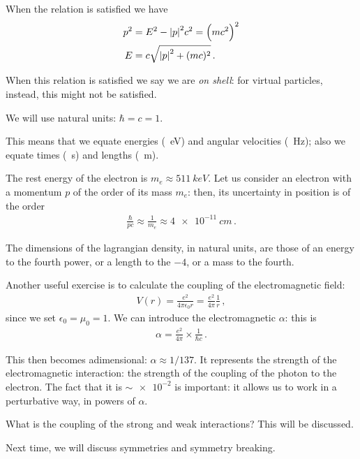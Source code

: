 \documentclass[main.tex]{subfiles}
\begin{document}
When the relation is satisfied we have 
%
\begin{align}
p^2 &= E^2 - \abs{p}^2 c^2= \qty(mc^2)^2  \\
E &= c \sqrt{\abs{p}^2 + (mc)^2}
\,.
\end{align}


When this relation is satisfied we say we are \emph{on shell}: for virtual particles, instead, this might not be satisfied.

We will use natural units: \(\hbar = c = 1\). 

This means that we equate energies (\SI{}{eV}) and angular velocities (\SI{}{Hz}); also we equate times (\SI{}{s}) and lengths (\SI{}{m}). 

The rest energy of the electron is \(m_e \approx \SI{511}{keV}\). 
Let us consider an electron with a momentum \(p\) of the order of its mass \(m_e\): then, its uncertainty in position is of the order 
%
\begin{align}
\frac{\hbar}{p c} \approx \frac{1}{m_e} \approx \SI{4e-11}{cm}
\,.
\end{align}

The dimensions of the lagrangian density, in natural units, are those of an energy to the fourth power, or a length to the \(-4\), or a mass to the fourth. 

Another useful exercise is to calculate the coupling of the electromagnetic field: 
%
\begin{align}
V(r) = \frac{e^2}{4 \pi \epsilon_{0} r} = \frac{e^2}{4 \pi } \frac{1}{r} 
\,,
\end{align}
%
since we set \(\epsilon_{0} = \mu_0 = 1\). 
We can introduce the electromagnetic \(\alpha \): this is 
%
\begin{align}
\alpha = \frac{e^2}{4 \pi } \times \frac{1}{\hbar c} 
\,.
\end{align}

This then becomes adimensional: \(\alpha \approx 1 / 137\). 
It represents the strength of the electromagnetic interaction: the strength of the coupling of the photon to the electron.  
The fact that it is \(\sim \num{e-2}\) is important: it allows us to work in a perturbative way, in powers of \(\alpha \). 

What is the coupling of the strong and weak interactions? This will be discussed.

Next time, we will discuss symmetries and symmetry breaking. 
\end{document}
